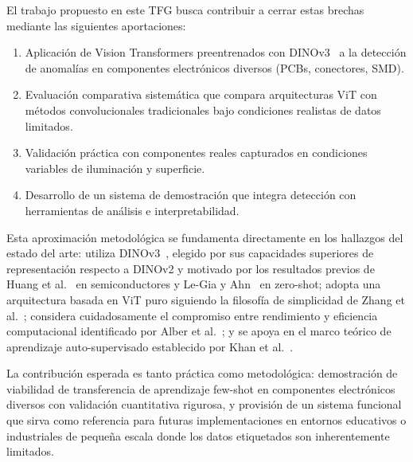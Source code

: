 El trabajo propuesto en este \gls{TFG} busca contribuir a cerrar estas brechas mediante las siguientes aportaciones:
\begin{enumerate}
    \item Aplicación de Vision Transformers preentrenados con DINOv3~\cite{simeoni2025dinov3} a la detección de anomalías en componentes electrónicos diversos (PCBs, conectores, SMD).
    \item Evaluación comparativa sistemática que compara arquitecturas ViT con métodos convolucionales tradicionales bajo condiciones realistas de datos limitados.
    \item Validación práctica con componentes reales capturados en condiciones variables de iluminación y superficie.
    \item Desarrollo de un sistema de demostración que integra detección con herramientas de análisis e interpretabilidad.
\end{enumerate}

Esta aproximación metodológica se fundamenta directamente en los hallazgos del estado del arte: utiliza DINOv3~\cite{simeoni2025dinov3}, elegido por sus capacidades superiores de representación respecto a DINOv2 y motivado por los resultados previos de Huang et al.~\cite{huang2025semiconductor} en semiconductores y Le-Gia y Ahn~\cite{legia2025consistent} en zero-shot; adopta una arquitectura basada en ViT puro siguiendo la filosofía de simplicidad de Zhang et al.~\cite{zhang2025exploring}; considera cuidadosamente el compromiso entre rendimiento y eficiencia computacional identificado por Alber et al.~\cite{alber2024evaluating}; y se apoya en el marco teórico de aprendizaje auto-supervisado establecido por Khan et al.~\cite{khan2024survey}.

La contribución esperada es tanto práctica como metodológica: demostración de viabilidad de transferencia de aprendizaje few-shot en componentes electrónicos diversos con validación cuantitativa rigurosa, y provisión de un sistema funcional que sirva como referencia para futuras implementaciones en entornos educativos o industriales de pequeña escala donde los datos etiquetados son inherentemente limitados.
